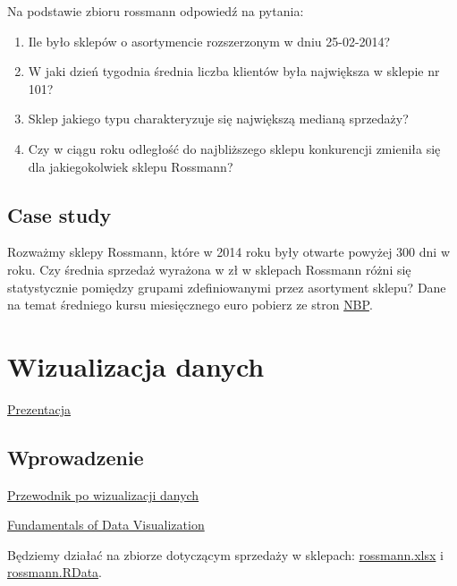 \documentclass[
]{book}
\providecommand{\tightlist}{%
  \setlength{\itemsep}{0pt}\setlength{\parskip}{0pt}}
\begin{document}
Na podstawie zbioru rossmann odpowiedź na pytania:

\begin{enumerate}
\def\labelenumi{\arabic{enumi}.}
\tightlist
\item
  Ile było sklepów o asortymencie rozszerzonym w dniu 25-02-2014?
\item
  W jaki dzień tygodnia średnia liczba klientów była największa w sklepie nr 101?
\item
  Sklep jakiego typu charakteryzuje się największą medianą sprzedaży?
\item
  Czy w ciągu roku odległość do najbliższego sklepu konkurencji zmieniła się dla jakiegokolwiek sklepu Rossmann?
\end{enumerate}

\hypertarget{case-study}{%
\section{Case study}\label{case-study}}

Rozważmy sklepy Rossmann, które w 2014 roku były otwarte powyżej 300 dni w roku. Czy średnia sprzedaż wyrażona w zł w sklepach Rossmann różni się statystycznie pomiędzy grupami zdefiniowanymi przez asortyment sklepu? Dane na temat średniego kursu miesięcznego euro pobierz ze stron \href{http://www.nbp.pl/home.aspx?f=/kursy/arch_a.html}{NBP}.

\hypertarget{wizualizacja-danych}{%
\chapter{Wizualizacja danych}\label{wizualizacja-danych}}

\href{presentations/04_wizualizacja.html}{Prezentacja}

\hypertarget{wprowadzenie-2}{%
\section{Wprowadzenie}\label{wprowadzenie-2}}

\href{https://www.data-to-viz.com/}{Przewodnik po wizualizacji danych}

\href{https://serialmentor.com/dataviz/}{Fundamentals of Data Visualization}

Będziemy działać na zbiorze dotyczącym sprzedaży w sklepach: \href{http://wawrowski.edu.pl/data/rossmann.xlsx}{rossmann.xlsx} i \href{http://wawrowski.edu.pl/data/rossmann.RData}{rossmann.RData}.
\end{document}
